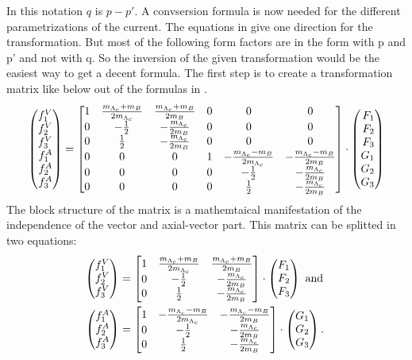 In this notation \(q\) is \(p - p'\). A convsersion formula is now needed for the 
different parametrizations of the current. The equations in 
{\cite[Eq. 15]{form_factor_conversion}} give one direction for the transformation. 
But most of the following form factors are in the form with p and p' and not 
with q. So the inversion of the given transformation would be the easiest 
way to get a decent formula.  
The first step is to create a transformation matrix like below out of the 
formulas in {\cite[Eq. 15]{form_factor_conversion}}.
\begin{equation}
  \Spvek{f^V_1; f^V_2; f^V_3; f^A_1; f^A_2; f^A_3} =
  \begin{bmatrix}
    1 & \frac{m_{\Lambda_c} + m_B }{2 m_{\Lambda_c}} & \frac{m_{\Lambda_c} + m_B }{2 m_B} & 0 & 0 & 0 \\
    0 & -\frac{1}{2} & -\frac{m_{\Lambda_c}}{2 m_B} & 0 & 0 & 0 \\
    0 & \frac{1}{2} & -\frac{m_{\Lambda_c}}{2 m_B} & 0 & 0 & 0 \\
    0 & 0 & 0 & 1 & -\frac{m_{\Lambda_c} - m_B }{2 m_{\Lambda_c}} & - \frac{m_{\Lambda_c} - m_B }{2 m_B} \\
    0 & 0 & 0 & 0 & -\frac{1}{2} & -\frac{m_{\Lambda_c}}{2 m_B} \\
    0 & 0 & 0 & 0 & \frac{1}{2} & -\frac{m_{\Lambda_c}}{2 m_B}
  \end{bmatrix}
  \cdot \Spvek{F_1; F_2; F_3; G_1; G_2; G_3} \label{eq:initmat}
\end{equation}
The block structure of the matrix is a mathemtaical manifestation of the 
independence of the vector and axial-vector part. This matrix can be splitted 
in two equations:
\begin{align}
  \Spvek{f^V_1; f^V_2; f^V_3} & =
  \begin{bmatrix}
    1 & \frac{m_{\Lambda_c} + m_B }{2 m_{\Lambda_c}} & \frac{m_{\Lambda_c} + m_B }{2 m_B} \\
    0 & -\frac{1}{2} & -\frac{m_{\Lambda_c}}{2 m_B} \\
    0 & \frac{1}{2} & -\frac{m_{\Lambda_c}}{2 m_B} \\
  \end{bmatrix}
  \cdot \Spvek{F_1; F_2; F_3} \nonumber \text{ and }\\
  \Spvek{f^A_1; f^A_2; f^A_3} & =
  \begin{bmatrix}
    1 & -\frac{m_{\Lambda_c} - m_B }{2 m_{\Lambda_c}} & - \frac{m_{\Lambda_c} - m_B }{2 m_B} \\
    0 & -\frac{1}{2} & -\frac{m_{\Lambda_c}}{2 m_B} \\
    0 & \frac{1}{2} & -\frac{m_{\Lambda_c}}{2 m_B}
  \end{bmatrix}
  \cdot \Spvek{G_1; G_2; G_3}. \label{eq:splitmat}
\end{align}
